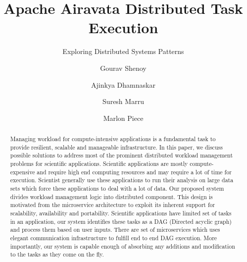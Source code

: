 \documentclass[sigconf]{acmart}
\begin{document}
\title{Apache Airavata Distributed Task Execution}
\subtitle{Exploring Distributed Systems Patterns}

\author{Gourav Shenoy}

\author{Ajinkya Dhamnaskar}

\author{Suresh Marru}

\author{Marlon Piece}

\begin{abstract}
Managing workload for compute-intensive applications is a fundamental task to provide resilient, scalable and manageable infrastructure. In this paper, we discuss possible solutions to address most of the prominent distributed workload management problems for scientific applications. Scientific applications are mostly compute-expensive and require high end computing resources and may require a lot of time for execution. Scientist generally use these applications to run their analysis on large data sets which force these applications to deal with a lot of data. Our proposed system divides workload management logic into distributed component. This design is motivated from the microservice architecture to exploit its inherent support for scalability, availability and portability.  Scientific applications have limited set of tasks in an application, our system identifies these tasks as a DAG (Directed acyclic graph) and process them based on user inputs. There are set of microservices which uses elegant communication infrastructure to fulfill end to end DAG execution.  More importantly, our system is capable enough of absorbing any additions and modification to the tasks as they come on the fly.   
\end{abstract}
\end{document}
